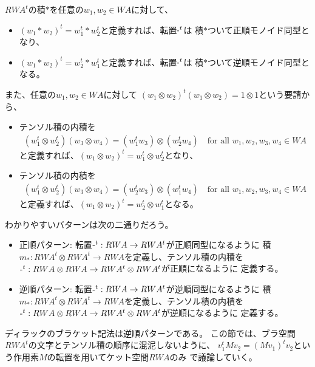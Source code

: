 	\begin{note}[双対空間の正順同型と逆順同型]\label{note:双対空間の正順同型と逆順同型} %
		$RWA^t$の積$*$を任意の$w_1,w_2\in WA$に対して、
		\begin{itemize}\setlength{\itemsep}{-1mm} %
			\item $(w_1*w_2)^t=w_1^t*w_2^t$と定義すれば、転置$\myhere^t$は
			積$*$ついて正順モノイド同型となり、
			\item $(w_1*w_2)^t=w_2^t*w_1^t$と定義すれば、転置$\myhere^t$は
			積$*$ついて逆順モノイド同型となる。
		\end{itemize} %
		また、任意の$w_1,w_2\in WA$に対して
		$(w_1\otimes w_2)^t(w_1\otimes w_2)=1\otimes 1$という要請から、
		\begin{itemize}\setlength{\itemsep}{-1mm} %
			\item テンソル積の内積を
			\begin{equation*}\begin{split} %
				(w_1^t\otimes w_2^t)(w_3\otimes w_4)=(w_1^tw_3)\otimes(w_2^tw_4)
				\quad\text{for all }w_1,w_2,w_3,w_4\in WA
			\end{split}\end{equation*} %
			と定義すれば、$(w_1\otimes w_2)^t=w_1^t\otimes w_2^t$となり、
			\item テンソル積の内積を
			\begin{equation*}\begin{split} %
				(w_1^t\otimes w_2^t)(w_3\otimes w_4)=(w_2^tw_3)\otimes(w_1^tw_4)
				\quad\text{for all }w_1,w_2,w_3,w_4\in WA
			\end{split}\end{equation*} %
			と定義すれば、$(w_1\otimes w_2)^t=w_2^t\otimes w_1^t$となる。
		\end{itemize} %
		わかりやすいバターンは次の二通りだろう。
		\begin{itemize}\setlength{\itemsep}{-1mm} %
			\item 正順パターン: 転置$\myhere^t:RWA\to RWA^t$が正順同型になるように
			積$m_*:RWA^t\otimes RWA^t\to RWA$を定義し、テンソル積の内積を
			$\myhere^t:RWA\otimes RWA\to RWA^t\otimes RWA^t$が正順になるように
			定義する。
			\item 逆順パターン: 転置$\myhere^t:RWA\to RWA^t$が逆順同型になるように
			積$m_*:RWA^t\otimes RWA^t\to RWA$を定義し、テンソル積の内積を
			$\myhere^t:RWA\otimes RWA\to RWA^t\otimes RWA^t$が逆順になるように
			定義する。
		\end{itemize} %
		ディラックのブラケット記法は逆順パターンである。
		この節では、ブラ空間$RWA^t$の文字とテンソル積の順序に混泥しないように、
		$v_1^tMv_2=(Mv_1)^tv_2$という作用素$M$の転置を用いてケット空間$RWA$のみ
		で議論していく。
	\end{note} %

